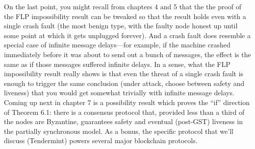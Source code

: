 On the last point, you might recall from chapters 4 and 5 that the the proof of the FLP
impossibility result can be tweaked so that the result holds even with a single crash fault
(the most benign type, with the faulty node honest up until some point at which it gets
unplugged forever). And a crash fault does resemble a special case of infinite message
delays—for example, if the machine crashed immediately before it was about to send out
a bunch of messages, the effect is the same as if those messages suffered infinite delays. In a sense, what the FLP impossibility result really shows is that even the threat of a single
crash fault is enough to trigger the same conclusion (under attack, choose between safety
and liveness) that you would get somewhat trivially with infinite message delays.
Coming up next in chapter 7 is a possibility result which proves the “if” direction of
Theorem 6.1: there is a consensus protocol that, provided less than a third of the nodes are
Byzantine, guarantees safety and eventual (post-GST) liveness in the partially synchronous
model. As a bonus, the specific protocol that we’ll discuss (Tendermint) powers several
major blockchain protocols.




